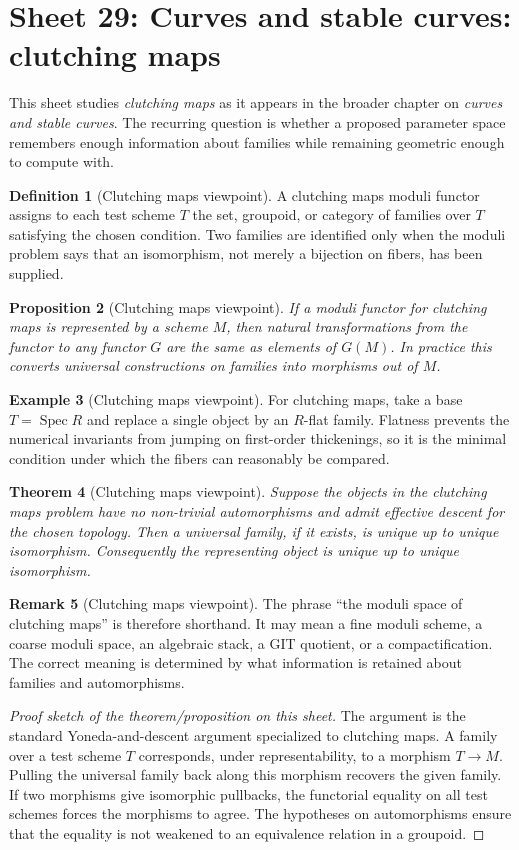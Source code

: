 \documentclass[11pt]{amsart}
\newtheorem{theorem}{Theorem}[section]
\newtheorem{proposition}[theorem]{Proposition}
\theoremstyle{definition}
\newtheorem{definition}[theorem]{Definition}
\newtheorem{example}[theorem]{Example}
\newtheorem{remark}[theorem]{Remark}
\newcommand{\Spec}{\operatorname{Spec}}
\begin{document}
\section{Sheet 29: Curves and stable curves: clutching maps}
This sheet studies \emph{clutching maps} as it appears in the broader chapter on \emph{curves and stable curves}.  The recurring question is whether a proposed parameter space remembers enough information about families while remaining geometric enough to compute with.
\begin{definition}[Clutching maps viewpoint]
A clutching maps moduli functor assigns to each test scheme $T$ the set, groupoid, or category of families over $T$ satisfying the chosen condition.  Two families are identified only when the moduli problem says that an isomorphism, not merely a bijection on fibers, has been supplied.
\end{definition}
\begin{proposition}[Clutching maps viewpoint]
If a moduli functor for clutching maps is represented by a scheme $M$, then natural transformations from the functor to any functor $G$ are the same as elements of $G(M)$.  In practice this converts universal constructions on families into morphisms out of $M$.
\end{proposition}
\begin{example}[Clutching maps viewpoint]
For clutching maps, take a base $T=\Spec R$ and replace a single object by an $R$-flat family.  Flatness prevents the numerical invariants from jumping on first-order thickenings, so it is the minimal condition under which the fibers can reasonably be compared.
\end{example}
\begin{theorem}[Clutching maps viewpoint]
Suppose the objects in the clutching maps problem have no non-trivial automorphisms and admit effective descent for the chosen topology.  Then a universal family, if it exists, is unique up to unique isomorphism.  Consequently the representing object is unique up to unique isomorphism.
\end{theorem}
\begin{remark}[Clutching maps viewpoint]
The phrase ``the moduli space of clutching maps'' is therefore shorthand.  It may mean a fine moduli scheme, a coarse moduli space, an algebraic stack, a GIT quotient, or a compactification.  The correct meaning is determined by what information is retained about families and automorphisms.
\end{remark}
\begin{proof}[Proof sketch of the theorem/proposition on this sheet]
The argument is the standard Yoneda-and-descent argument specialized to clutching maps.  A family over a test scheme $T$ corresponds, under representability, to a morphism $T\to M$.  Pulling the universal family back along this morphism recovers the given family.  If two morphisms give isomorphic pullbacks, the functorial equality on all test schemes forces the morphisms to agree.  The hypotheses on automorphisms ensure that the equality is not weakened to an equivalence relation in a groupoid.
\end{proof}
\end{document}
